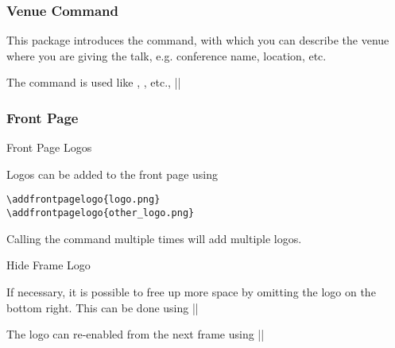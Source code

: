 \documentclass{beamer}
\begin{document}
\showlogo

\begin{frame}
  \frametitle{Venue Command}

  This package introduces the  command, with which you can
  describe the venue where you are giving the talk, e.g. conference name,
  location, etc.\newline

  The command is used like , , etc.,
  ||

\end{frame}

\begin{frame}[fragile]
  \frametitle{Front Page}

  \begin{block}{Front Page Logos}

    Logos can be added to the front page using
    \begin{verbatim}
\addfrontpagelogo{logo.png}
\addfrontpagelogo{other_logo.png}
    \end{verbatim}

    Calling the command multiple times will add multiple logos.
  \end{block}

  \begin{block}{Hide Frame Logo}

    If necessary, it is possible to free up more space by omitting the logo on
    the bottom right.  This can be done using
    |\hidelogo|

    The logo can re-enabled from the next frame using
    |\showlogo|
  \end{block}

\end{frame}
\end{document}
